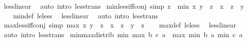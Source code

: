 \begin{isabellebody}
\ less{\isacharunderscore}{\kern0pt}linear\ \isamarkupfalse%
\ {\isacharparenleft}{\kern0pt}auto\ intro{\isacharcolon}{\kern0pt}\ less{\isacharunderscore}{\kern0pt}trans{\isacharparenright}{\kern0pt}%
\endisatagproof
{\isafoldproof}%
%
\isadelimproof
\isanewline
%
\endisadelimproof
\isanewline
{}\isamarkupfalse%
\ min{\isacharunderscore}{\kern0pt}less{\isacharunderscore}{\kern0pt}iff{\isacharunderscore}{\kern0pt}conj\ {\isacharbrackleft}{\kern0pt}simp{\isacharbrackright}{\kern0pt}{\isacharcolon}{\kern0pt}\ {\isachardoublequoteopen}z\ {\isacharless}{\kern0pt}\ min\ x\ y\ {\isasymlongleftrightarrow}\ z\ {\isacharless}{\kern0pt}\ x\ {\isasymand}\ z\ {\isacharless}{\kern0pt}\ y{\isachardoublequoteclose}\isanewline
%
\isadelimproof
\ \ %
\endisadelimproof
%
\isatagproof
{}\isamarkupfalse%
\ min{\isacharunderscore}{\kern0pt}def\ le{\isacharunderscore}{\kern0pt}less\ \isamarkupfalse%
\ less{\isacharunderscore}{\kern0pt}linear\ \isamarkupfalse%
\ {\isacharparenleft}{\kern0pt}auto\ intro{\isacharcolon}{\kern0pt}\ less{\isacharunderscore}{\kern0pt}trans{\isacharparenright}{\kern0pt}%
\endisatagproof
{\isafoldproof}%
%
\isadelimproof
\isanewline
%
\endisadelimproof
\isanewline
{}\isamarkupfalse%
\ max{\isacharunderscore}{\kern0pt}less{\isacharunderscore}{\kern0pt}iff{\isacharunderscore}{\kern0pt}conj\ {\isacharbrackleft}{\kern0pt}simp{\isacharbrackright}{\kern0pt}{\isacharcolon}{\kern0pt}\ {\isachardoublequoteopen}max\ x\ y\ {\isacharless}{\kern0pt}\ z\ {\isasymlongleftrightarrow}\ x\ {\isacharless}{\kern0pt}\ z\ {\isasymand}\ y\ {\isacharless}{\kern0pt}\ z{\isachardoublequoteclose}\isanewline
%
\isadelimproof
\ \ %
\endisadelimproof
%
\isatagproof
{}\isamarkupfalse%
\ max{\isacharunderscore}{\kern0pt}def\ le{\isacharunderscore}{\kern0pt}less\ \isamarkupfalse%
\ less{\isacharunderscore}{\kern0pt}linear\ \isamarkupfalse%
\ {\isacharparenleft}{\kern0pt}auto\ intro{\isacharcolon}{\kern0pt}\ less{\isacharunderscore}{\kern0pt}trans{\isacharparenright}{\kern0pt}%
\endisatagproof
{\isafoldproof}%
%
\isadelimproof
\isanewline
%
\endisadelimproof
\isanewline
{}\isamarkupfalse%
\ min{\isacharunderscore}{\kern0pt}max{\isacharunderscore}{\kern0pt}distrib{}{\isacharcolon}{\kern0pt}\ {\isachardoublequoteopen}min\ {\isacharparenleft}{\kern0pt}max\ b\ c{\isacharparenright}{\kern0pt}\ a\ {\isacharequal}{\kern0pt}\ max\ {\isacharparenleft}{\kern0pt}min\ b\ a{\isacharparenright}{\kern0pt}\ {\isacharparenleft}{\kern0pt}min\ c\ a{\isacharparenright}{\kern0pt}{\isachardoublequoteclose}\isanewline

\end{isabellebody}
